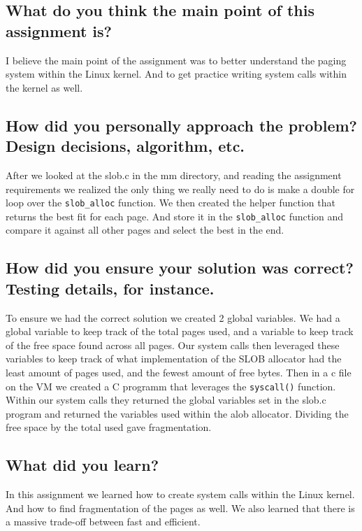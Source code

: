 \documentclass{article}
\begin{document}
    \subsection{What do you think the main point of this assignment is?}
        I believe the main point of the assignment was to better understand the paging system within the Linux kernel. And to get practice writing system calls within the kernel as well.
    \subsection{How did you personally approach the problem? Design decisions, algorithm, etc.}
        After we looked at the slob.c in the mm directory, and reading the assignment requirements we realized the only thing we really need to do is make a double for loop over the \texttt{slob\_alloc} function. We then created the helper function that returns the best fit for each page. And store it in the \texttt{slob\_alloc} function and compare it against all other pages and select the best in the end.
    \subsection{How did you ensure your solution was correct? Testing details, for instance.}
        To ensure we had the correct solution we created 2 global variables. We had a global variable to keep track of the total pages used, and a variable to keep track of the free space found across all pages. Our system calls then leveraged these variables to keep track of what implementation of the SLOB allocator had the least amount of pages used, and the fewest amount of free bytes. Then in a c file on the VM we created a C programm that leverages the \texttt{syscall()} function. Within our system calls they returned the global variables set in the slob.c program and returned the variables used within the alob allocator. Dividing the free space by the total used gave fragmentation. 

    \subsection{What did you learn?}
        In this assignment we learned how to create system calls within the Linux kernel. And how to find fragmentation of the pages as well. We also learned that there is a massive trade-off between fast and efficient.
\setlength{\pdfpageheight}{\paperheight}
\setlength{\pdfpagewidth}{\paperwidth}
\end{document}
